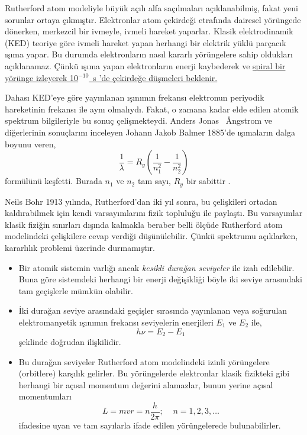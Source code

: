 \documentclass[a4paper,12pt, twoside]{article}
\begin{document}
Rutherford atom modeliyle büyük açılı alfa saçılmaları açıklanabilmiş, fakat yeni sorunlar ortaya çıkmıştır. Elektronlar atom çekirdeği etrafında dairesel yörüngede dönerken, merkezcil bir ivmeyle, ivmeli hareket yaparlar. Klasik elektrodinamik (KED) teoriye göre ivmeli hareket yapan herhangi bir elektrik yüklü parçacık ışıma yapar. Bu durumda elektronların nasıl kararlı yörüngelere sahip oldukları açıklanamaz. Çünkü ışıma yapan elektronların enerji kaybederek ve \href{http://bcs.wiley.com/he-bcs/Books?action=mininav&bcsId=1533&itemId=0471057002&assetId=17327&resourceId=1342}{spiral bir yörünge izleyerek 10$^{-10}$~s 'de çekirdeğe düşmeleri beklenir.} 

Dahası KED'eye göre yayınlanan ışınımın frekansı elektronun periyodik hareketinin frekansı ile aynı olmalıydı. Fakat, o zamana kadar elde edilen atomik spektrum bilgileriyle bu sonuç çelişmekteydi. Anders Jonas \SI{}{\angstrom}ngstrom ve diğerlerinin sonuçlarını inceleyen Johann Jakob Balmer 1885'de ışımaların dalga boyunu veren, 
\begin{equation}
\frac{1}{\lambda}= R_y \left( \frac{1}{n_1^2} - \frac{1}{n_2^2} \right)
\label{eq:balmer}
\end{equation}
formülünü keşfetti. Burada $n_1$ ve $n_2$ tam sayı, $R_y$ bir sabittir \cite{book:Gasiorowicz}.

Neils Bohr 1913 yılında, Rutherford'dan iki yıl sonra, bu çelişkileri ortadan kaldırabilmek için kendi varsayımlarını fizik topluluğu ile paylaştı. Bu varsayımlar klasik fiziğin sınırları dışında kalmakla beraber belli ölçüde Rutherford atom modelindeki çelişkilere cevap verdiği düşünülebilir. Çünkü spektrumu açıklarken, kararlılık problemi üzerinde durmamıştır.

\begin{itemize}
\item Bir atomik sistemin varlığı ancak {\it kesikli durağan seviyeler} ile izah edilebilir. Buna göre sistemdeki herhangi bir enerji değişikliği böyle iki seviye arasındaki tam geçişlerle mümkün olabilir.

\item İki durağan seviye arasındaki geçişler sırasında yayınlanan veya soğurulan elektromanyetik ışınımın frekansı seviyelerin enerjileri $E_1$ ve $E_2$ ile,
\begin{equation}
h\nu = E_2 - E_1
\label{eq:bohr_states}
\end{equation}
şeklinde doğrudan ilişkilidir.

\item Bu durağan seviyeler Rutherford atom modelindeki izinli yörüngelere (orbitlere) karşılık gelirler. Bu yörüngelerde elektronlar klasik fizikteki gibi herhangi bir açısal momentum değerini alamazlar, bunun yerine açısal momentumları
\begin{equation}
L = m v r  = n \frac{h}{2 \pi}
\label{eq:bohr_allowed_states}; \;\;\;\; n=1,2,3, \dots
\end{equation}
ifadesine uyan ve tam sayılarla ifade edilen yörüngelerede bulunabilirler.
\end{itemize}
\end{document}
